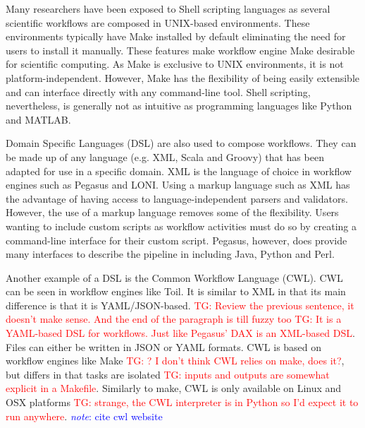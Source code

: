 \documentclass{report}
\newcommand{\note}[1]{\textcolor{blue}{\textit{note}: #1}}
\newcommand{\tristan}[1]{\textcolor{red}{TG: #1}}
\begin{document}
            Many researchers have been exposed to Shell scripting languages as 
            several scientific workflows are composed in UNIX-based 
            environments. These environments typically have Make installed by
            default eliminating the need for users to install it manually.
            These features make workflow engine Make desirable for scientific
            computing.
            As Make is exclusive to UNIX environments, it is not 
            platform-independent. However, Make has the flexibility of being
            easily extensible and can interface directly with any command-line
            tool. Shell scripting, nevertheless, is generally not as intuitive
            as programming languages like Python and MATLAB.

            Domain Specific Languages (DSL) are also used to compose workflows.
            They can be made up of any language (e.g. XML, Scala and Groovy) that has been adapted for use in 
            a specific domain.
            XML is the language of choice in  
            workflow engines such as Pegasus and LONI. Using a markup language
            such as XML has the advantage of having access to 
            language-independent parsers and validators. However, the use of a 
            markup language removes some of the flexibility. Users wanting to 
            include 
            custom scripts as workflow activities must do so by creating a 
            command-line interface for their custom script. Pegasus, however,
            does provide many interfaces to describe the pipeline in including
            Java, Python and Perl.

            Another example of a DSL is the Common Workflow
            Language (CWL). CWL can be seen in workflow engines like Toil. 
            It is similar to XML in that its main difference is that it is 
            YAML/JSON-based. \tristan{Review the previous sentence, it doesn't make sense. And the end of the paragraph is till fuzzy too}
            \tristan{It is a YAML-based DSL for workflows. Just like Pegasus' DAX is an XML-based DSL}. Files can either be written in JSON or YAML formats. CWL is 
            based on workflow engines like Make \tristan{? I don't think CWL relies on make, does it?}, but differs in that tasks
            are isolated \tristan{inputs and outputs are somewhat explicit in a Makefile}. Similarly to 
            make, CWL is only available on Linux and OSX platforms \tristan{strange, the CWL interpreter is in Python so I'd expect it to run anywhere}. \note{cite cwl 
            website}
\end{document}
